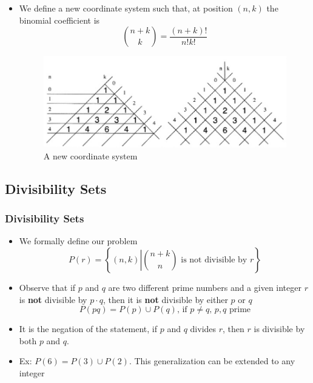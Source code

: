 \documentclass{beamer}
\begin{document}
\begin{frame}
    \begin{itemize}
        \item We define a new coordinate system such that, at position $(n,k)$ the binomial coefficient is 
        \begin{equation*}
            \binom{n+k}{k} = \frac{(n+k)!}{n!k!}
        \end{equation*}
        \begin{figure}
            \centering
            \includegraphics[scale=0.39]{newCoordinate.png}
            \caption{A new coordinate system}
        \end{figure}
    \end{itemize}
\end{frame}

\subsection{Divisibility Sets}
\begin{frame}
    \frametitle{Divisibility Sets}
    \begin{itemize}
        \item We formally define our problem
        \begin{equation*}
            P(r) = \left\{ (n,k) \left| \binom{n+k}{n} \text{ is not divisible by }r \right. \right\}
        \end{equation*}
        \item Observe that if $p$ and $q$ are two different prime numbers and a given integer $r$ is \textbf{not} divisible by $p \cdot q$, then it is \textbf{not} divisible by either $p$ or $q$
        \begin{equation*}
            P(pq) = P(p) \cup P(q) \text{, if $p \neq q$, $p,q$ prime}
        \end{equation*}
        \item It is the negation of the statement, if $p$ and $q$ divides $r$, then $r$ is divisible by both $p$ and $q$.
        \item Ex: $P(6) = P(3) \cup P(2)$. This generalization can be extended to any integer
    \end{itemize}
\end{frame}
\end{document}
